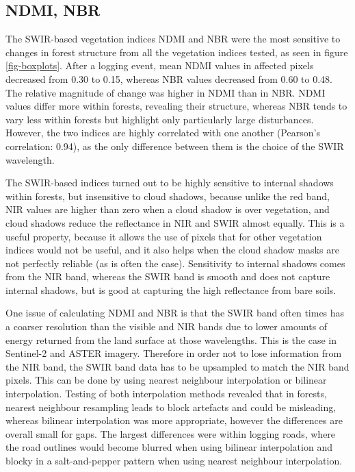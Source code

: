 \documentclass[a4paper,12pt]{scrbook}
\begin{document}
\subsection{NDMI, NBR}

The \ac{SWIR}-based vegetation indices \ac{NDMI} and \ac{NBR} were the most sensitive to changes in forest structure from all the vegetation indices tested, as seen in figure \ref{fig-boxplots}. After a logging event, mean \ac{NDMI} values in affected pixels decreased from 0.30 to 0.15, whereas \ac{NBR} values decreased from 0.60 to 0.48. The relative magnitude of change was higher in \ac{NDMI} than in \ac{NBR}. \ac{NDMI} values differ more within forests, revealing their structure, whereas \ac{NBR} tends to vary less within forests but highlight only particularly large disturbances. However, the two indices are highly correlated with one another (Pearson's correlation: 0.94), as the only difference between them is the choice of the \ac{SWIR} wavelength.

The \ac{SWIR}-based indices turned out to be highly sensitive to internal shadows within forests, but insensitive to cloud shadows, because unlike the red band, \ac{NIR} values are higher than zero when a cloud shadow is over vegetation, and cloud shadows reduce the reflectance in \ac{NIR} and \ac{SWIR} almost equally. This is a useful property, because it allows the use of pixels that for other vegetation indices would not be useful, and it also helps when the cloud shadow masks are not perfectly reliable (as is often the case). Sensitivity to internal shadows comes from the \ac{NIR} band, whereas the \ac{SWIR} band is smooth and does not capture internal shadows, but is good at capturing the high reflectance from bare soils.

One issue of calculating \ac{NDMI} and \ac{NBR} is that the \ac{SWIR} band often times has a coarser resolution than the visible and \ac{NIR} bands due to lower amounts of energy returned from the land surface at those wavelengths. This is the case in Sentinel-2 and \ac{ASTER} imagery. Therefore in order not to lose information from the \ac{NIR} band, the \ac{SWIR} band data has to be upsampled to match the \ac{NIR} band pixels. This can be done by using nearest neighbour interpolation or bilinear interpolation. Testing of both interpolation methods revealed that in forests, nearest neighbour resampling leads to block artefacts and could be misleading, whereas bilinear interpolation was more appropriate, however the differences are overall small for gaps. The largest differences were within logging roads, where the road outlines would become blurred when using bilinear interpolation and blocky in a salt-and-pepper pattern when using nearest neighbour interpolation.
\end{document}
